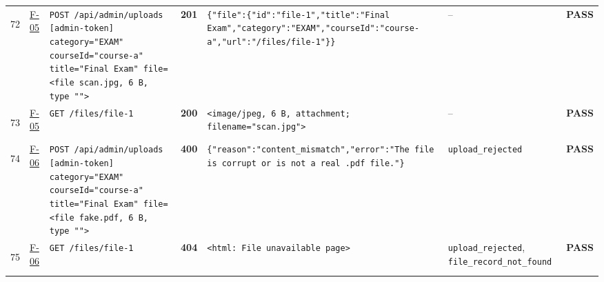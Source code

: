 \documentclass[10pt,a4paper]{article}
\begin{document}
\begin{landscape}
\begin{longtable}{@{}P{0.6cm}P{0.9cm}P{8.5cm}P{1.0cm}P{6.2cm}P{4.2cm}P{1.1cm}@{}}
\hypertarget{call72}{72} & \hyperlink{test-F-05}{F-05} & \texttt{POST /\allowbreak{}api/\allowbreak{}admin/\allowbreak{}uploads [admin-\allowbreak{}token] category=\allowbreak{}"\allowbreak{}EXAM"\allowbreak{} courseId=\allowbreak{}"\allowbreak{}course-\allowbreak{}a"\allowbreak{} title=\allowbreak{}"\allowbreak{}Final Exam"\allowbreak{} file=\allowbreak{}<file scan.\allowbreak{}jpg,\allowbreak{} 6 B,\allowbreak{} type "\allowbreak{}"\allowbreak{}>} & \textcolor{passgreen}{\textbf{201}} & \texttt{\{"\allowbreak{}file"\allowbreak{}:\allowbreak{}\{"\allowbreak{}id"\allowbreak{}:\allowbreak{}"\allowbreak{}file-\allowbreak{}1"\allowbreak{},\allowbreak{}"\allowbreak{}title"\allowbreak{}:\allowbreak{}"\allowbreak{}Final Exam"\allowbreak{},\allowbreak{}"\allowbreak{}category"\allowbreak{}:\allowbreak{}"\allowbreak{}EXAM"\allowbreak{},\allowbreak{}"\allowbreak{}courseId"\allowbreak{}:\allowbreak{}"\allowbreak{}course-\allowbreak{}a"\allowbreak{},\allowbreak{}"\allowbreak{}url"\allowbreak{}:\allowbreak{}"\allowbreak{}/\allowbreak{}files/\allowbreak{}file-\allowbreak{}1"\allowbreak{}\}\}} & -- & \textcolor{passgreen}{\textbf{PASS}} \\
\hypertarget{call73}{73} & \hyperlink{test-F-05}{F-05} & \texttt{GET /\allowbreak{}files/\allowbreak{}file-\allowbreak{}1} & \textcolor{passgreen}{\textbf{200}} & \texttt{<image/\allowbreak{}jpeg,\allowbreak{} 6 B,\allowbreak{} attachment; filename=\allowbreak{}"\allowbreak{}scan.\allowbreak{}jpg"\allowbreak{}>} & -- & \textcolor{passgreen}{\textbf{PASS}} \\
\hypertarget{call74}{74} & \hyperlink{test-F-06}{F-06} & \texttt{POST /\allowbreak{}api/\allowbreak{}admin/\allowbreak{}uploads [admin-\allowbreak{}token] category=\allowbreak{}"\allowbreak{}EXAM"\allowbreak{} courseId=\allowbreak{}"\allowbreak{}course-\allowbreak{}a"\allowbreak{} title=\allowbreak{}"\allowbreak{}Final Exam"\allowbreak{} file=\allowbreak{}<file fake.\allowbreak{}pdf,\allowbreak{} 6 B,\allowbreak{} type "\allowbreak{}"\allowbreak{}>} & \textcolor{warnamber}{\textbf{400}} & \texttt{\{"\allowbreak{}reason"\allowbreak{}:\allowbreak{}"\allowbreak{}content\_\allowbreak{}mismatch"\allowbreak{},\allowbreak{}"\allowbreak{}error"\allowbreak{}:\allowbreak{}"\allowbreak{}The file is corrupt or is not a real .\allowbreak{}pdf file.\allowbreak{}"\allowbreak{}\}} & \texttt{upload\_\allowbreak{}rejected} & \textcolor{passgreen}{\textbf{PASS}} \\
\hypertarget{call75}{75} & \hyperlink{test-F-06}{F-06} & \texttt{GET /\allowbreak{}files/\allowbreak{}file-\allowbreak{}1} & \textcolor{warnamber}{\textbf{404}} & \texttt{<html:\allowbreak{} File unavailable page>} & \texttt{upload\_\allowbreak{}rejected}, \texttt{file\_\allowbreak{}record\_\allowbreak{}not\_\allowbreak{}found} & \textcolor{passgreen}{\textbf{PASS}} \\

\end{longtable}
\end{landscape}
\end{document}
